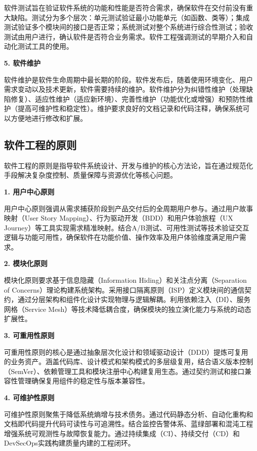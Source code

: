 软件测试旨在验证软件系统的功能和性能是否符合需求，确保软件在交付前没有重大缺陷。测试分为多个层次：单元测试验证最小功能单元（如函数、类等）；集成测试验证多个模块间的接口是否正常；系统测试对整个系统进行综合性测试；验收测试由用户进行，确认软件是否符合业务需求。软件工程强调测试的早期介入和自动化测试工具的使用。

\textbf{5. 软件维护}

软件维护是软件生命周期中最长期的阶段。软件发布后，随着使用环境变化、用户需求变动以及技术更新，软件需要持续的维护。软件维护分为纠错性维护（处理缺陷修复）、适应性维护（适应新环境）、完善性维护（功能优化或增强）和预防性维护（提高可维护性和稳定性）。维护要求良好的文档记录和代码注释，确保系统可以方便地进行修改和扩展。

\subsection{软件工程的原则}

软件工程的原则是指导软件系统设计、开发与维护的核心方法论，旨在通过规范化手段解决复杂度控制、质量保障与资源优化等核心问题。

\textbf{1. 用户中心原则}

用户中心原则强调从需求捕获阶段到产品交付后的全周期用户参与。通过用户故事映射（User Story Mapping）、行为驱动开发（BDD）和用户体验旅程（UX Journey）等工具实现需求精准映射。结合A/B测试、可用性测试等技术验证交互逻辑与功能可用性，确保软件在功能价值、操作效率及用户体验维度满足用户需求。

\textbf{2. 模块化原则}

模块化原则要求基于信息隐藏（Information Hiding）和关注点分离（Separation of Concerns）理论构建系统架构。采用接口隔离原则（ISP）定义模块间的通信契约，通过分层架构和组件化设计实现物理与逻辑解耦。利用依赖注入（DI）、服务网格（Service Mesh）等技术降低耦合度，确保模块的独立演化能力与系统的动态扩展性。

\textbf{3. 可重用性原则}

可重用性原则的核心是通过抽象层次化设计和领域驱动设计（DDD）提炼可复用的业务资产。涵盖代码库、设计模式和架构模式的多层级复用，结合语义版本控制（SemVer）、依赖管理工具和模块注册中心构建复用生态。通过契约测试和接口兼容性管理确保复用组件的稳定性与版本兼容性。

\textbf{4. 可维护性原则}

可维护性原则聚焦于降低系统熵增与技术债务。通过代码静态分析、自动化重构和文档即代码提升代码可读性与可追溯性。结合监控告警体系、蓝绿部署和混沌工程增强系统可观测性与故障恢复能力。通过持续集成（CI）、持续交付（CD）和DevSecOps实践构建质量内建的工程闭环。

